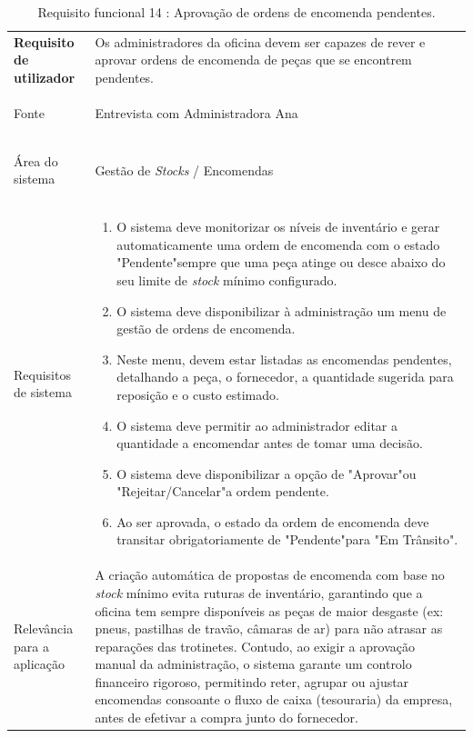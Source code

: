 \documentclass[a4paper,12pt]{scrreprt}
\begin{document}
\begin{table}[H]
    \centering
    \renewcommand{\arraystretch}{1.5} 
    
    \begin{tabular}{|>{\columncolor{gray!15}\bfseries}p{4cm}|p{10.5cm}|}
        \hline
        Requisito de utilizador & Os administradores da oficina devem ser capazes de rever e aprovar ordens de encomenda de peças que se encontrem pendentes. \\ \hdashline
        
        Fonte & Entrevista com Administradora Ana \\ \hdashline
        
        Área do sistema & Gestão de \textit{Stocks} / Encomendas \\ \hdashline
        
        Requisitos de sistema & 
        \begin{enumerate}[leftmargin=*, nosep, topsep=2pt, partopsep=0pt]
            \item O sistema deve monitorizar os níveis de inventário e gerar automaticamente uma ordem de encomenda com o estado "Pendente"\space sempre que uma peça atinge ou desce abaixo do seu limite de \textit{stock} mínimo configurado.
            \item O sistema deve disponibilizar à administração um menu de gestão de ordens de encomenda.
            \item Neste menu, devem estar listadas as encomendas pendentes, detalhando a peça, o fornecedor, a quantidade sugerida para reposição e o custo estimado.
            \item O sistema deve permitir ao administrador editar a quantidade a encomendar antes de tomar uma decisão.
            \item O sistema deve disponibilizar a opção de "Aprovar"\space ou "Rejeitar/Cancelar"\space a ordem pendente.
            \item Ao ser aprovada, o estado da ordem de encomenda deve transitar obrigatoriamente de "Pendente"\space para "Em Trânsito".
        \end{enumerate} \\ \hdashline
        
        Relevância para a aplicação & A criação automática de propostas de encomenda com base no \textit{stock} mínimo evita ruturas de inventário, garantindo que a oficina tem sempre disponíveis as peças de maior desgaste (ex: pneus, pastilhas de travão, câmaras de ar) para não atrasar as reparações das trotinetes. Contudo, ao exigir a aprovação manual da administração, o sistema garante um controlo financeiro rigoroso, permitindo reter, agrupar ou ajustar encomendas consoante o fluxo de caixa (tesouraria) da empresa, antes de efetivar a compra junto do fornecedor. \\ \hline
    \end{tabular}
    \caption{Requisito funcional 14 : Aprovação de ordens de encomenda pendentes.}
    \label{tab:rf_aprovacao_encomendas}
\end{table}
\end{document}
